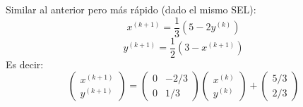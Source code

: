 \begin{ejemplo}
\begin{itemize}
    Similar al anterior pero más rápido (dado el mismo SEL):
    $$x^{(k+1)}=\dfrac{1}{3}(5-2y^{(k)})$$
    $$y^{(k+1)}=\dfrac{1}{2}(3-x^{(k+1)})$$
    Es decir:
    $$
        \left(\begin{array}{c}
                x^{(k+1)} \\
                y^{(k+1)}
            \end{array}\right) =
        \left(\begin{array}{cc}
                0 & -2/3 \\
                0 & 1/3
            \end{array}\right)
        \left(\begin{array}{c}
                x^{(k)} \\
                y^{(k)}
            \end{array}\right) +
        \left(\begin{array}{c}
                5/3 \\
                2/3
            \end{array}\right)
    $$
    \end{itemize}
\end{ejemplo}

